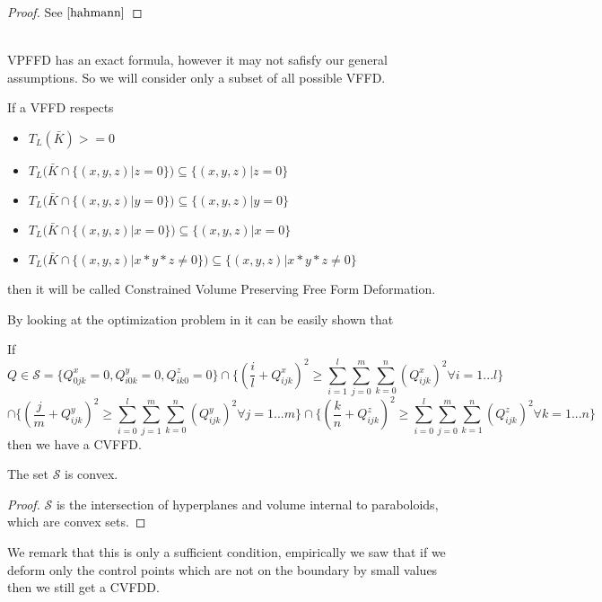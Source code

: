 \documentclass{article}
\begin{document}
\begin{proof}
See $\cite{hahmann}$
\end{proof}\hfill\\
VPFFD has an exact formula, however it may not safisfy our general assumptions. So we will consider only a subset of all possible VFFD.
\begin{Definition}
\hfill\newline
If a VFFD respects
\begin{itemize}
\item $ T_{L}(\bar{K})>=0$ 
\item $T_{L}(\bar{K}\cap \{(x,y,z)| z=0 \})\subseteq  \{(x,y,z)| z=0 \}$
\item $T_{L}(\bar{K}\cap \{(x,y,z)| y=0 \})\subseteq  \{(x,y,z)| y=0 \}$
\item $T_{L}(\bar{K}\cap \{(x,y,z)| x=0 \})\subseteq  \{(x,y,z)| x=0 \}$
\item $T_{L}(\bar{K}\cap \{(x,y,z)| x*y*z\neq 0 \})\subseteq  \{(x,y,z)| x*y*z\neq 0 \}$
\end{itemize}
then it will be called Constrained Volume Preserving Free Form Deformation.
\end{Definition}
By looking at the optimization problem in \cite{hahmann} it can be easily shown that 
\begin{Theorem}\label{thm:cvffd}
\hfill\newline
If $$Q\in \mathcal{S}=\{ Q_{0jk}^{x}=0,Q_{i0k}^{y}=0, Q_{ik0}^{z}=0\} \cap \{  (\frac{i}{l}+Q_{ijk}^{x})^{2}\ge \sum_{i=1}^{l}\sum_{j=0}^{m}\sum_{k=0}^{n} (Q_{ijk}^{x})^{2} \forall i=1...l \} $$ 
$$\cap \{(\frac{j}{m}+Q_{ijk}^{y})^{2}\ge \sum_{i=0}^{l}\sum_{j=1}^{m}\sum_{k=0}^{n} (Q_{ijk}^{y})^{2} \forall j=1...m \} \cap \{(\frac{k}{n}+Q_{ijk}^{z})^{2}\ge \sum_{i=0}^{l}\sum_{j=0}^{m}\sum_{k=1}^{n} (Q_{ijk}^{z})^{2} \forall k=1...n \} $$ 
then we have a CVFFD.
\end{Theorem}
\begin{Theorem}
The set $\mathcal{S}$ is convex.
\end{Theorem}
\begin{proof}
$\mathcal{S}$ is the intersection of hyperplanes and volume internal to paraboloids, which are convex sets.
\end{proof}
We remark that this is only a sufficient condition, empirically we saw that if we deform only the control points which are not on the boundary by small values then we still get a CVFDD. \\
\end{document}
